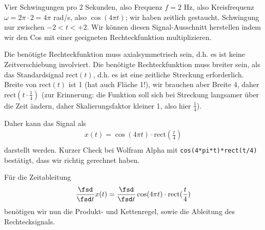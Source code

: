 \begin{ExCalc}
Vier Schwingungen pro 2 Sekunden, also Frequenz $f=2$ Hz, also Kreisfrequenz
$\omega=2\pi\cdot 2 = 4\pi$ rad/s, also $\cos(4\pi t)$; wir haben zeitlich gestaucht.
Schwingung nur zwischen $-2 < t < +2$. Wir können diesen Signal-Ausschnitt herstellen indem wir den Cos mit einer geeigneten Rechteckfunktion multiplizieren.

Die benötigte Rechteckfunktion muss axialsymmetrisch sein, d.h. es ist keine
Zeitverschiebung involviert.
Die benötigte Rechteckfunktion muss breiter sein, als das Standardsignal
$\mathrm{rect}(t)$, d.h. es ist eine zeitliche Streckung erforderlich.
Breite von $\mathrm{rect}(t)$ ist 1 (hat auch Fläche 1!), wir brauchen aber
Breite 4, daher $\mathrm{rect}(t\cdot \frac{1}{4})$ (zur Erinnerung:
die Funktion soll sich bei Streckung langsamer über die Zeit ändern, daher
Skalierungsfaktor kleiner 1, also hier $\frac{1}{4}$).

Daher kann das Signal als
\begin{align}
x(t) = \cos(4\pi t) \cdot \mathrm{rect}(\frac{t}{4})\\
\end{align}
darstellt werden. Kurzer Check bei Wolfram Alpha mit \texttt{cos(4*pi*t)*rect(t/4)} bestätigt, dass wir richtig
gerechnet haben.

Für die Zeitableitung
\begin{align}
\frac{\fsd }{\fsd t} x(t) =
\frac{\fsd }{\fsd t} \cos(4\pi t) \cdot \mathrm{rect}(\frac{t}{4})\\
\end{align}
benötigen wir nun die Produkt- und Kettenregel, sowie die Ableitung des Rechtecksignals.
%


\end{ExCalc}
